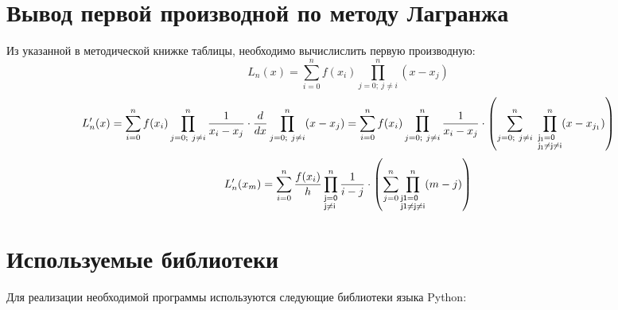 \documentclass{article}
\begin{document}
\section{Вывод первой производной по методу Лагранжа}
Из указанной в методической книжке таблицы, необходимо вычислислить первую производную:
\[
L_n(x) = \sum \limits_{i = 0}^n f(x_i) \prod \limits_{j = 0;\ j \neq i}^n (x - x_j)
\]
\[
L'_n(x) = \sum \limits_{i = 0}^n f(x_i) \prod \limits_{j = 0;\ j \neq i}^n \dfrac 1 {x_i - x_j} \cdot \dfrac d {dx} \prod \limits_{j = 0;\ j \neq i}^n (x - x_j) = \sum \limits_{i = 0}^n f(x_i) \prod \limits_{j = 0;\ j \neq i}^n \dfrac 1 {x_i - x_j} \cdot \left(\sum \limits^n_{j = 0;\ j \neq i}\ \prod \limits_{
\begin{subarray}{l}
\mathsf{j_1 = 0}\\
\mathsf{j_1 \neq j \neq i}
\end{subarray}
}^n (x - x_{j_1})\right)
\]
\[
L'_n(x_m) = \sum \limits_{i = 0}^n \dfrac{f(x_i)}{h} \prod \limits^n_{
\begin{subarray}{l}
\mathsf{j = 0} \\
\mathsf{j \neq i}
\end{subarray}}
\dfrac 1 {i - j} \cdot \left(\sum \limits_{j = 0}^n \prod \limits_{
\begin{subarray}{l}
\mathsf{j1 = 0} \\
\mathsf{j1 \neq j \neq i}
\end{subarray}
}^n (m - j) \right)
\]

\section{Используемые библиотеки}
Для реализации необходимой программы используются следующие библиотеки языка Python:
\end{document}
